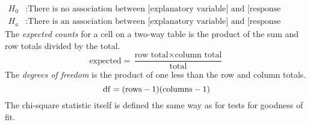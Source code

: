 \documentclass[../AP_Statistics.tex]{subfiles}
\begin{document}
			\[\begin{aligned}
				H_0&: \text{There is no association between [explanatory variable] and [response variable]} \\
				H_a&: \text{There is an association between [explanatory variable] and [response variable]}
			\end{aligned}\]
			The \emph{expected counts} for a cell on a two-way table is the product of the sum and row totals divided by the total.
			\[\mathrm{expected = \frac{\text{row total} \times \text{column total}}{total}}\]
			The \emph{degrees of freedom} is the product of one less than the row and column totals.
			\[\mathrm{\operatorname{\mathrm{df}} = (rows - 1)(columns - 1)}\]
			The chi-square statistic itself is defined the same way as for tests for goodness of fit.
\end{document}
